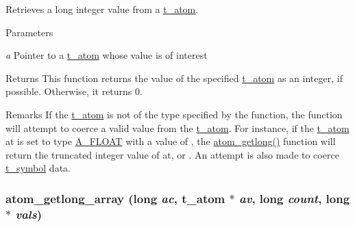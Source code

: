 Retrieves a long integer value from a \hyperlink{structt__atom}{t\_\-atom}. 
\begin{DoxyParams}{Parameters}
\item[{\em a}]Pointer to a \hyperlink{structt__atom}{t\_\-atom} whose value is of interest \end{DoxyParams}
\begin{DoxyReturn}{Returns}
This function returns the value of the specified \hyperlink{structt__atom}{t\_\-atom} as an integer, if possible. Otherwise, it returns 0. 
\end{DoxyReturn}
\begin{DoxyRemark}{Remarks}
If the \hyperlink{structt__atom}{t\_\-atom} is not of the type specified by the function, the function will attempt to coerce a valid value from the \hyperlink{structt__atom}{t\_\-atom}. For instance, if the \hyperlink{structt__atom}{t\_\-atom} {\ttfamily at} is set to type \hyperlink{group__atom_gga8aa6700e9f00b132eb376db6e39ade47a0b3aa0ab8104573dfc9cb70b5b08031f}{A\_\-FLOAT} with a value of {}, the \hyperlink{group__atom_ga62c0a631f50db54ec654a9e40b992fe2}{atom\_\-getlong()} function will return the truncated integer value of {\ttfamily at}, or {}. An attempt is also made to coerce \hyperlink{structt__symbol}{t\_\-symbol} data. 
\end{DoxyRemark}
\hypertarget{group__atom_ga0bb78863f0f99d492b5241c9158b10cc}{
\subsubsection[{atom\_\-getlong\_\-array}]{ atom\_\-getlong\_\-array (long {\em ac}, \/  {\bf t\_\-atom} $\ast$ {\em av}, \/  long {\em count}, \/  long $\ast$ {\em vals})}}
\label{group__atom_ga0bb78863f0f99d492b5241c9158b10cc}


